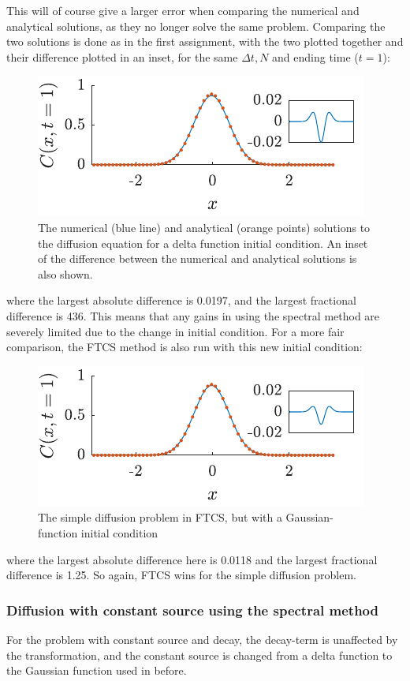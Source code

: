 \documentclass[a4paper,10pt]{article} 	%
\numberwithin{equation}{section}
\begin{document}
	This will of course give a larger error when comparing the numerical and analytical solutions, as they no longer solve the same problem. Comparing the two solutions is done as in the first assignment, with the two plotted together and their difference plotted in an inset, for the same $ \Delta t,N $ and ending time ($ t=1 $):
	\begin{figure}[H]
		\centering
		\includegraphics[width = 0.5\linewidth]{spectralSimple.pdf}
		\caption{The numerical (blue line) and analytical (orange points) solutions to the diffusion equation for a delta function initial condition. An inset of the difference between the numerical and analytical solutions is also shown.}
		\label{fig:spectralSimple}
	\end{figure}
	where the largest absolute difference is 0.0197, and the largest fractional difference is 436. This means that any gains in using the spectral method are severely limited due to the change in initial condition. For a more fair comparison, the FTCS method is also run with this new initial condition:
	\begin{figure}[H]
		\centering
		\includegraphics[width = 0.5\linewidth]{newSimple.pdf}
		\caption{The simple diffusion problem in FTCS, but with a Gaussian-function initial condition}
		\label{fig:newSimple}
	\end{figure}
	where the largest absolute difference here is 0.0118 and the largest fractional difference is 1.25. So again, FTCS wins for the simple diffusion problem.
	
	
	\subsubsection{Diffusion with constant source using the spectral method}
	For the problem with constant source and decay, the decay-term is unaffected by the transformation, and the constant source is changed from a delta function to the Gaussian function used in before.
	
\end{document}
